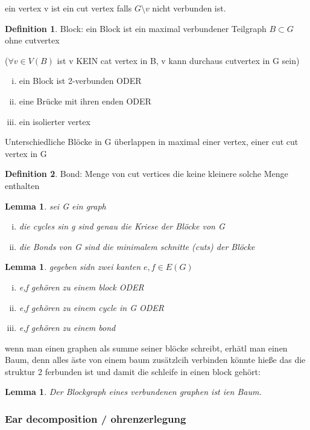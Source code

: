 \documentclass[a4paper]{article}
\newtheorem{lemma}[theorem]{Lemma}
\theoremstyle{definition}
\newtheorem{definition}{Definition}
\theoremstyle{remark}
\begin{document}
ein vertex v ist ein cut vertex falls $G\setminus v$ nicht verbunden ist.
\begin{definition}
 Block: ein Block ist ein maximal verbundener Teilgraph $ B\subset G$ ohne cutvertex 
\end{definition}
($\forall v \in V(B)$ ist v KEIN cat vertex in B, v kann durchaus cutvertex in G sein)
\begin{enumerate}[(i)]
  \item ein Block ist 2-verbunden ODER
  \item eine Brücke mit ihren enden ODER
  \item ein isolierter vertex
\end{enumerate}
Unterschiedliche Blöcke in G überlappen in maximal einer vertex, einer cut cut vertex in G\\
\begin{definition}
  Bond: Menge von cut vertices die keine kleinere solche Menge enthalten
\end{definition}
\begin{lemma}
  sei G ein graph 
  \begin{enumerate}[(i)]
    \item die cycles sin g sind genau die Kriese der Blöcke von G
    \item die Bonds von G sind die minimalem schnitte (cuts) der Blöcke
  \end{enumerate}
\end{lemma}
\begin{lemma}
  gegeben sidn zwei  kanten  $ e,f \in E(G)$ 
  \begin{enumerate}[(i)]
    \item e,f gehören zu einem block ODER
    \item e,f gehören zu einem cycle in G ODER
    \item e,f gehören zu einem bond
  \end{enumerate}
\end{lemma}
wenn man einen graphen als summe seiner blöcke schreibt, erhätl man einen Baum, denn alles äste von einem baum zusätzlcih verbinden könnte hieße das die struktur 2 ferbunden ist und damit die schleife in einen block gehört:
\begin{lemma}
  Der Blockgraph eines verbundenen graphen ist ien Baum.
\end{lemma}
\subsubsection{Ear decomposition / ohrenzerlegung}
\label{ssub:ear_decomposition_ohrenzerlegung}
\end{document}
